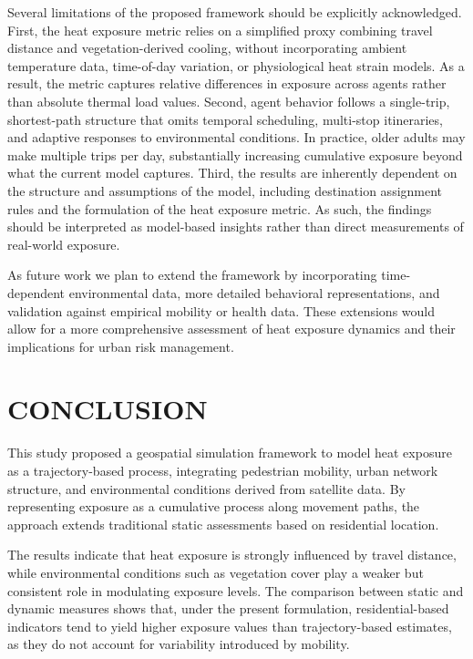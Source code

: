 \documentclass{wscpaperproc}
\theoremstyle{wsc}
\begin{document}
Several limitations of the proposed framework should be explicitly acknowledged. First, the heat exposure metric relies on a simplified proxy combining travel distance and vegetation-derived cooling, without incorporating ambient temperature data, time-of-day variation, or physiological heat strain models. As a result, the metric captures relative differences in exposure across agents rather than absolute thermal load values. Second, agent behavior follows a single-trip, shortest-path structure that omits temporal scheduling, multi-stop itineraries, and adaptive responses to environmental conditions. In practice, older adults may make multiple trips per day, substantially increasing cumulative exposure beyond what the current model captures.
Third, the results are inherently dependent on the structure and assumptions of the model, including destination assignment rules and the formulation of the heat exposure metric. As such, the findings should be interpreted as model-based insights rather than direct measurements of real-world exposure.

As future work we plan to extend the framework by incorporating time-dependent environmental data, more detailed behavioral representations, and validation against empirical mobility or health data. These extensions would allow for a more comprehensive assessment of heat exposure dynamics and their implications for urban risk management.

\section{CONCLUSION}

This study proposed a geospatial simulation framework to model heat exposure as a trajectory-based process, integrating pedestrian mobility, urban network structure, and environmental conditions derived from satellite data. By representing exposure as a cumulative process along movement paths, the approach extends traditional static assessments based on residential location.

The results indicate that heat exposure is strongly influenced by travel distance, while environmental conditions such as vegetation cover play a weaker but consistent role in modulating exposure levels. The comparison between static and dynamic measures shows that, under the present formulation, residential-based indicators tend to yield higher exposure values than trajectory-based estimates, as they do not account for variability introduced by mobility.
\end{document}
